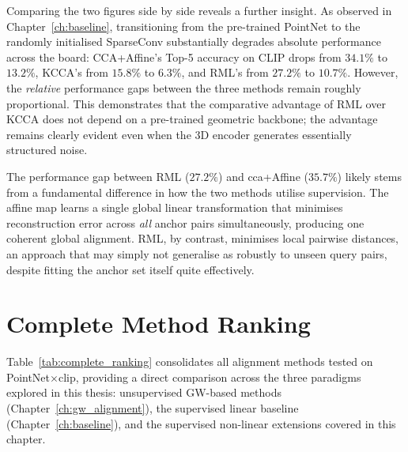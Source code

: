 Comparing the two figures side by side reveals a further insight. As observed in Chapter~\ref{ch:baseline}, transitioning from the pre-trained PointNet to the randomly initialised SparseConv substantially degrades absolute performance across the board: CCA+Affine's Top-5 accuracy on CLIP drops from $34.1\%$ to $13.2\%$, KCCA's from $15.8\%$ to $6.3\%$, and RML's from $27.2\%$ to $10.7\%$. However, the \emph{relative} performance gaps between the three methods remain roughly proportional. This demonstrates that the comparative advantage of RML over KCCA does not depend on a pre-trained geometric backbone; the advantage remains clearly evident even when the 3D encoder generates essentially structured noise.

The performance gap between RML ($27.2\%$) and \gls{cca}+Affine ($35.7\%$) likely stems from a fundamental difference in how the two methods utilise supervision. The affine map learns a single global linear transformation that minimises reconstruction error across \emph{all} anchor pairs simultaneously, producing one coherent global alignment. RML, by contrast, minimises local pairwise distances, an approach that may simply not generalise as robustly to unseen query pairs, despite fitting the anchor set itself quite effectively.

\section{Complete Method Ranking}
\label{sec:nonlinear_ranking}

Table~\ref{tab:complete_ranking} consolidates all alignment methods tested on PointNet$\times$\gls{clip}, providing a direct comparison across the three paradigms explored in this thesis: unsupervised GW-based methods (Chapter~\ref{ch:gw_alignment}), the supervised linear baseline (Chapter~\ref{ch:baseline}), and the supervised non-linear extensions covered in this chapter.

